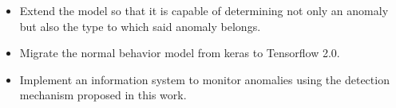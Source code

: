 \begin{itemize}
\item Extend the model so that it is capable of determining not only an anomaly but also the type to which said anomaly belongs.
\item Migrate the normal behavior model from keras to Tensorflow 2.0.
\item Implement an information system to monitor anomalies using the detection mechanism proposed in this work.
\end{itemize}

 

